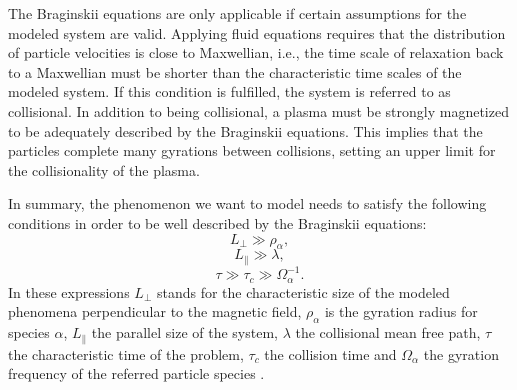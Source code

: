 The Braginskii equations are only applicable if certain assumptions for the modeled system are valid. Applying fluid equations requires that the distribution of particle velocities is close to Maxwellian, i.e., the time scale of relaxation back to a Maxwellian must be shorter than the characteristic time scales of the modeled system. If this condition is fulfilled, the system is referred to as collisional. %
In addition to being collisional, a plasma must be strongly magnetized to be adequately described by the Braginskii equations. This implies that the particles complete many gyrations between collisions, setting an upper limit for the collisionality of the plasma. %

In summary, the phenomenon we want to model needs to satisfy the following conditions in order to be well described by the Braginskii equations:
\begin{equation}
	L_\perp \gg \rho_\alpha,
\end{equation}
\begin{equation}
	L_\parallel \gg \lambda,
\end{equation}
\begin{equation}
	\tau \gg \tau_c \gg \Omega_\alpha^{-1}. 
\end{equation}
In these expressions $L_\perp$ stands for the characteristic size of the modeled phenomena perpendicular to the magnetic field, $\rho_\alpha$ is the gyration radius for species $\alpha$, $L_\parallel$ the parallel size of the system, $\lambda$ the collisional mean free path, $\tau$ the characteristic time of the problem, $\tau_c$ the collision time and $\Omega_\alpha$ the gyration frequency of the referred particle species \cite{militellobook}. 

